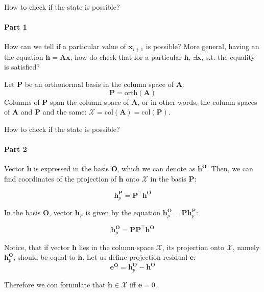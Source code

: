 \documentclass{beamer}
\begin{document}
\begin{frame}{How to check if the state is possible?}
\framesubtitle{Part 1}
\begin{flushleft}

How can we tell if a particular value of $\mathbf x_{i+1}$ is possible? More general, having an the equation $\mathbf h = \mathbf A \mathbf x$, how do check that for a particular $\mathbf h$, $\exists \mathbf x$, s.t. the equality is satisfied?

\bigskip

Let $\mathbf P$ be an orthonormal basis in the column space of $\mathbf A$:
\[
\mathbf P = \text{orth} (\mathbf A)
\]
Columns of $\mathbf P$ span the column space of $\mathbf A$, or in other words, the column spaces of $\mathbf A$ and $\mathbf P$ and the same: $\mathcal{X} = \text{col} (\mathbf A) = \text{col} (\mathbf P)$.

\end{flushleft}
\end{frame}



\begin{frame}{How to check if the state is possible?}
\framesubtitle{Part 2}
\begin{flushleft}

Vector $\mathbf h$ is expressed in the basis $\mathbf O$, which we can denote as $\mathbf h^{\mathbf O}$. Then, we can find coordinates of the projection of $\mathbf h$ onto $\mathcal{X}$ in the basis $\mathbf P$:

\[
\mathbf h_p^{\mathbf P} = \mathbf P^\top \mathbf h^{\mathbf O}
\]

In the basis $\mathbf O$, vector $\mathbf h_P$ is given by the equation $\mathbf h_p^{\mathbf O} = \mathbf P \mathbf h_p^{\mathbf P}$:

\[
\mathbf h_p^{\mathbf O} =\mathbf P  \mathbf P^\top \mathbf h^{\mathbf O}
\]

\bigskip

Notice, that if vector $\mathbf h$ lies in the column space $\mathcal{X}$, its projection onto $\mathcal{X}$, namely $\mathbf h_p^{\mathbf O}$, should be equal to $\mathbf h$. Let us define projection residual $\mathbf e$:
\[
\mathbf e^{\mathbf O} = \mathbf h_p^{\mathbf O} - \mathbf h^{\mathbf O}
\]

Therefore we con formulate that $\mathbf h \in \mathcal{X}$ iff $\mathbf e = 0$.


\end{flushleft}
\end{frame}
\end{document}
